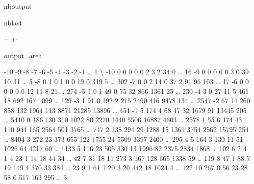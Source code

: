 \documentclass[letterpaper,10pt,english]{sphinxmanual}
\newlength\nbsphinxcodecellspacing
\begin{document}
\begin{sphinxuseclass}{nboutput}
\begin{sphinxuseclass}{nblast}
{

\kern-\sphinxverbatimsmallskipamount\kern-\baselineskip
\kern+\FrameHeightAdjust\kern-\fboxrule
\vspace{\nbsphinxcodecellspacing}

\begin{sphinxuseclass}{output_area}
\begin{sphinxuseclass}{}


\begin{sphinxVerbatim}[commandchars=\\\{\}]
\llap{\color{nbsphinxout}[73]:\,\hspace{\fboxrule}\hspace{\fboxsep}}     -10  -9   -8    -7   -6    -5    -4    -3     -2     -1   {\ldots}    1   \textbackslash{}
-10    0    0    0     0    0     2     3     2     34      0  {\ldots}    16
-9     0    0    0     6    0     3     0    39     10     31  {\ldots}     5
-8     0    1    0     1    0     0    19     0    319      5  {\ldots}   302
-7     0    0    2    14    0    37     2    91     96    103  {\ldots}    17
-6     0    0    0     0    0     0    12    11      8     21  {\ldots}   274
-5     1    0    1    49    0    75    32   866   1361     25  {\ldots}   230
-4     3    0   27    11    5   461    18   692    167   1099  {\ldots}   129
-3     1   91    0   192    2   215  2490   416   9478    134  {\ldots}  2547
-2    67   14  260   858  132  1964   113  8871  21285  13896  {\ldots}   454
-1     5  174    4    68   47    32  1679    91  13445    205  {\ldots}  5410
 0   186  130  310  1022   80  2270  1440  5506  16887   4603  {\ldots}  2578
 1    55    6  174    43  110   944   165  2564    501   3765  {\ldots}   747
 2   138  294   29  1288   15  1361  3754  2562  15795    254  {\ldots}  8404
 3   272   23  373   655  122  1755    24  5509   3397   2400  {\ldots}   295
 4     5  164    3   130   11    51  1026    64   4217     60  {\ldots}  1133
 5   116   23  505   330   13  1996    82  2375   2834   1868  {\ldots}   102
 6     2    4    1     4   23     1    14    18     44     34  {\ldots}    42
 7    31   18   11   273    3   167   128   665   1338     59  {\ldots}   119
 8    47    1   88     7   19   149     4   370     33    384  {\ldots}    23
 9     1   61    1    20    3    20   442    18   1024      4  {\ldots}   122
 10  267    0   56    23   28    58     0   517    163    295  {\ldots}     3


\end{sphinxVerbatim}
\end{sphinxuseclass}
\end{sphinxuseclass}}
\end{sphinxuseclass}
\end{sphinxuseclass}
\end{document}
